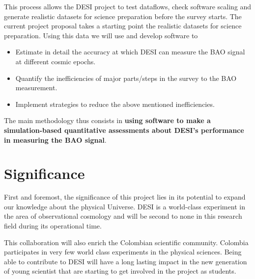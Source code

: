 \documentclass[12pt]{article}
\begin{document}
This process allows the DESI project to test dataflows, check software
scaling  and generate realistic datasets for science preparation before
the survey starts. The current project proposal takes a starting point the
realistic datasets for science preparation. Using this data we will
use and develop software to  
\begin{itemize}
\item Estimate in detail the accuracy at which DESI can measure the
  BAO signal at different cosmic epochs.
\item Quantify the inefficiencies of major parts/steps in the survey
  to the BAO measurement.
\item Implement strategies to reduce the above mentioned inefficiencies. 
\end{itemize}

The main methodology thus consists in {\bf using software to make a
simulation-based quantitative assessments about DESI's performance in
measuring the BAO signal}. 

\section*{Significance}

First and foremost, the significance of this project lies in its
potential to expand our knowledge about the physical Universe. DESI is
a world-class experiment in the area of observational cosmology and
will be second to none in this research field during its operational
time.  
 

This collaboration will also enrich the Colombian scientific
community. Colombia participates in very few world class experiments
in the physical sciences. Being able to contribute to DESI will have a
long lasting impact in the new generation of young scientist that are
starting to get involved in the project as students.
\end{document}
